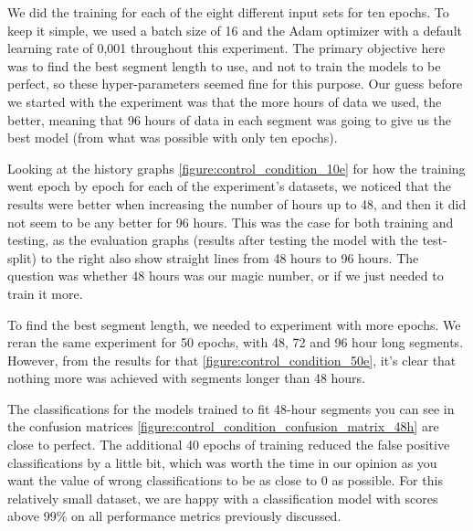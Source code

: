 We did the training for each of the eight different input sets for ten epochs. To keep it simple, we used a batch size of 16 and the Adam optimizer 
with a default learning rate of 0,001 throughout this experiment. The primary objective here was to find the best segment length to use, and not to 
train the models to be perfect,  so these hyper-parameters seemed fine for this purpose. Our guess before we started with the experiment was that 
the more hours of data we used, the better, meaning that 96 hours of data in each segment was going to give us the best model (from what was possible with only ten epochs).

Looking at the history graphs \ref{figure:control_condition_10e} for how the training went epoch by epoch for each of the experiment's datasets, 
we noticed that the results were better when increasing the number of hours up to 48, and then it did not seem to be any better for 96 hours. 
This was the case for both training and testing, as the evaluation graphs (results after testing the model with the test-split) to the right also show straight lines from 
48 hours to 96 hours. The question was whether 48 hours was our magic number, or if we just needed to train it more.

To find the best segment length, we needed to experiment with more epochs. We reran the same experiment for 50 epochs, with 48, 72 and 96 hour long segments. 
However, from the results for that \ref{figure:control_condition_50e}, it's clear that nothing more was achieved with segments longer than 48 hours. 

The classifications for the models trained to fit 48-hour segments you can see in the confusion matrices \ref{figure:control_condition_confusion_matrix_48h} 
are close to perfect. The additional 40 epochs of training reduced the false positive classifications by a little bit, which was worth the time in our opinion as 
you want the value of wrong classifications to be as close to 0 as possible. For this relatively small dataset, we are happy with a 
classification model with scores above 99\% on all performance metrics previously discussed. 

